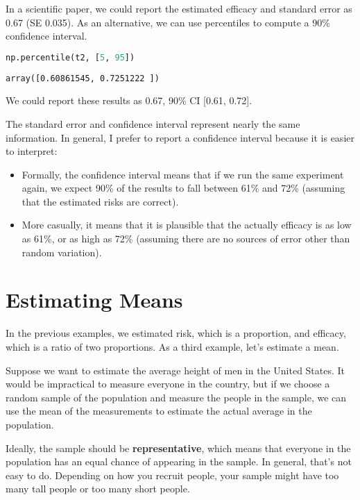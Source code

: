 In a scientific paper, we could report the estimated efficacy and
standard error as 0.67 (SE 0.035). As an alternative, we can use
percentiles to compute a 90\% confidence interval.

\begin{lstlisting}[language=Python,style=source]
np.percentile(t2, [5, 95])
\end{lstlisting}

\begin{lstlisting}[style=output]
array([0.60861545, 0.7251222 ])
\end{lstlisting}

We could report these results as 0.67, 90\% CI {[}0.61, 0.72{]}.

The standard error and confidence interval represent nearly the same
information. In general, I prefer to report a confidence interval
because it is easier to interpret:

\begin{itemize}
\item
  Formally, the confidence interval means that if we run the same
  experiment again, we expect 90\% of the results to fall between 61\%
  and 72\% (assuming that the estimated risks are correct).
\item
  More casually, it means that it is plausible that the actually
  efficacy is as low as 61\%, or as high as 72\% (assuming there are no
  sources of error other than random variation).
\end{itemize}

\section{Estimating Means}\label{estimating-means}

In the previous examples, we estimated risk, which is a proportion, and
efficacy, which is a ratio of two proportions. As a third example, let's
estimate a mean.

Suppose we want to estimate the average height of men in the United
States. It would be impractical to measure everyone in the country, but
if we choose a random sample of the population and measure the people in
the sample, we can use the mean of the measurements to estimate the
actual average in the population.

Ideally, the sample should be \textbf{representative}, which means that
everyone in the population has an equal chance of appearing in the
sample. In general, that's not easy to do. Depending on how you recruit
people, your sample might have too many tall people or too many short
people.

